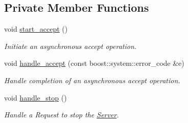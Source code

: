 \subsection*{Private Member Functions}
\begin{DoxyCompactItemize}
\item 
void \hyperlink{classwebsocket_1_1Server_a01514c0f01fc493222b2d8b877dee540}{start\+\_\+accept} ()
\begin{DoxyCompactList}\small\item\em Initiate an asynchronous accept operation. \end{DoxyCompactList}\item 
void \hyperlink{classwebsocket_1_1Server_a3c14a674a090698e82fc59db5df4b3c4}{handle\+\_\+accept} (const boost\+::system\+::error\+\_\+code \&e)
\begin{DoxyCompactList}\small\item\em Handle completion of an asynchronous accept operation. \end{DoxyCompactList}\item 
void \hyperlink{classwebsocket_1_1Server_a4abf8e0742d15023f0ac95ced8aee07a}{handle\+\_\+stop} ()
\begin{DoxyCompactList}\small\item\em Handle a Request to stop the \hyperlink{classwebsocket_1_1Server}{Server}. \end{DoxyCompactList}\end{DoxyCompactItemize}

